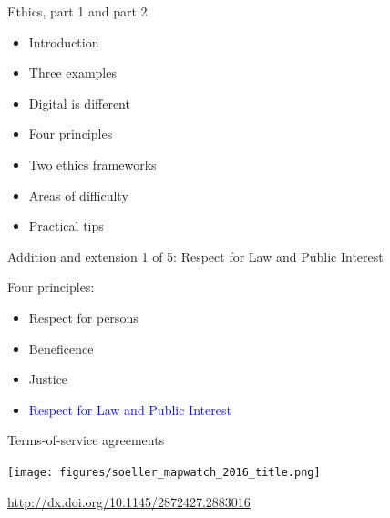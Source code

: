 \documentclass{beamer}
\begin{document}
\begin{frame}

Ethics, part 1 and part 2
\begin{itemize}
\item Introduction
\item Three examples
\item Digital is different
\item Four principles
\item Two ethics frameworks
\item Areas of difficulty
\item Practical tips
\end{itemize}

\end{frame}
\begin{frame}

\begin{center}
Addition and extension 1 of 5: Respect for Law and Public Interest
\end{center}

\end{frame}
\begin{frame}

Four principles:
\begin{itemize}
\item Respect for persons
\item Beneficence
\item Justice
\item \textcolor{blue}{Respect for Law and Public Interest}
\end{itemize}

\end{frame}
\begin{frame}

Terms-of-service agreements

\end{frame}
\begin{frame}

\begin{center}
\texttt{[image: figures/soeller\_mapwatch\_2016\_title.png]}
\end{center}

\vfill
\url{http://dx.doi.org/10.1145/2872427.2883016}
\end{frame}
\end{document}
